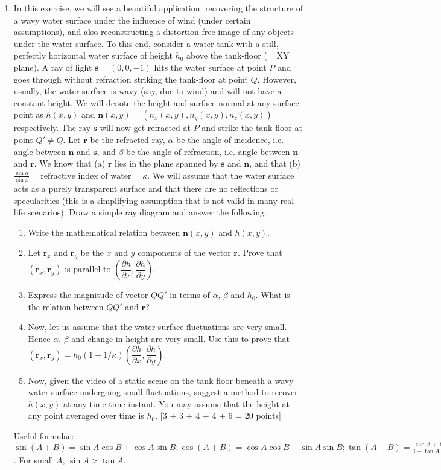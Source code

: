 \documentclass[11pt]{article}
\begin{document}
\begin{enumerate}
\item In this exercise, we will see a beautiful application: recovering the structure of a wavy water surface under the influence of wind (under certain assumptions), and also reconstructing a distortion-free image of any objects under the water surface. To this end, consider a water-tank with a still, perfectly horizontal water surface of height $h_0$ above the tank-floor (= XY plane). A ray of light $\mathbf{s} = (0,0,-1)$ hits the water surface at point $P$ and goes through without refraction striking the tank-floor at point $Q$. However, usually, the water surface is wavy (say, due to wind) and will not have a constant height. We will denote the height and surface normal at any surface point as $h(x,y)$ and $\mathbf{n}(x,y) = (n_x(x,y),n_y(x,y),n_z(x,y))$ respectively.  The ray $\mathbf{s}$ will now get refracted at $P$ and strike the tank-floor at point $Q' \neq Q$. Let $\mathbf{r}$ be the refracted ray, $\alpha$ be the angle of incidence, i.e. angle between $\mathbf{n}$ and $\mathbf{s}$, and $\beta$ be the angle of refraction, i.e. angle between $\mathbf{n}$ and $\mathbf{r}$. We know that (a) $\mathbf{r}$ lies in the plane spanned by $\mathbf{s}$ and $\mathbf{n}$, and that (b) $\frac{\sin \alpha}{\sin \beta} = \textrm{refractive index of water} = \kappa$. We will assume that the water surface acts as a purely transparent surface and that there are no reflections or specularities (this is a simplifying assumption that is not valid in many real-life scenarios). Draw a simple ray diagram and answer the following:
\begin{enumerate}
\item Write the mathematical relation between $\mathbf{n}(x,y)$ and $h(x,y)$.
\item Let $\mathbf{r}_x$ and $\mathbf{r}_y$ be the $x$ and $y$ components of the vector $\mathbf{r}$. Prove that $(\mathbf{r}_x,\mathbf{r}_y)$ is parallel to $(\dfrac{\partial h}{\partial x},\dfrac{\partial h}{\partial y})$.
\item Express the magnitude of vector $QQ'$ in terms of $\alpha$, $\beta$ and $h_0$. What is the relation between $QQ'$ and $\mathbf{r}$?
\item Now, let us assume that the water surface fluctuations are very small. Hence $\alpha$, $\beta$ and change in height are very small. Use this to prove that $(\mathbf{r}_x,\mathbf{r}_y) = h_0(1-1/\kappa)(\dfrac{\partial h}{\partial x},\dfrac{\partial h}{\partial y})$.
\item Now, given the video of a static scene on the tank floor beneath a wavy water surface undergoing small fluctuations, suggest a method to recover $h(x,y)$ at any time time instant. You may assume that the height at any point averaged over time is $h_0$. \textsf{[3 + 3 + 4 + 4 + 6 = 20 points]}
\end{enumerate}
Useful formulae: $\sin(A+B) = \sin A \cos B + \cos A \sin B; \cos(A+B) = \cos A \cos B - \sin A \sin B; \tan (A+B) = \frac{\tan A + \tan B}{1 - \tan A \tan B}; \tan(A-B) = \frac{\tan A - \tan B}{1 + \tan A \tan B}$. For small $A$, $\sin A \approx \tan A$.

\end{enumerate}
\end{document}
